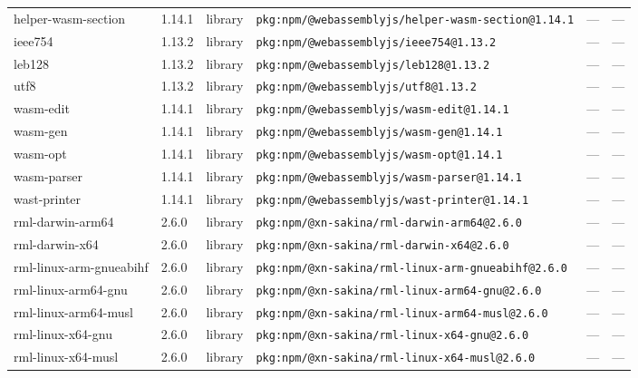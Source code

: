 \documentclass[11pt,a4paper]{article}
\begin{document}
\begin{longtable}{|p{4cm}|p{2cm}|p{1.6cm}|p{5cm}|p{1.5cm}|p{3.5cm}|}
\raggedright helper-wasm-section & 1.14.1 & library & \small\texttt{pkg:npm/@webassemblyjs/helper-wasm-section@1.14.1} & — & \small — \\
\raggedright ieee754 & 1.13.2 & library & \small\texttt{pkg:npm/@webassemblyjs/ieee754@1.13.2} & — & \small — \\
\raggedright leb128 & 1.13.2 & library & \small\texttt{pkg:npm/@webassemblyjs/leb128@1.13.2} & — & \small — \\
\raggedright utf8 & 1.13.2 & library & \small\texttt{pkg:npm/@webassemblyjs/utf8@1.13.2} & — & \small — \\
\raggedright wasm-edit & 1.14.1 & library & \small\texttt{pkg:npm/@webassemblyjs/wasm-edit@1.14.1} & — & \small — \\
\raggedright wasm-gen & 1.14.1 & library & \small\texttt{pkg:npm/@webassemblyjs/wasm-gen@1.14.1} & — & \small — \\
\raggedright wasm-opt & 1.14.1 & library & \small\texttt{pkg:npm/@webassemblyjs/wasm-opt@1.14.1} & — & \small — \\
\raggedright wasm-parser & 1.14.1 & library & \small\texttt{pkg:npm/@webassemblyjs/wasm-parser@1.14.1} & — & \small — \\
\raggedright wast-printer & 1.14.1 & library & \small\texttt{pkg:npm/@webassemblyjs/wast-printer@1.14.1} & — & \small — \\
\raggedright rml-darwin-arm64 & 2.6.0 & library & \small\texttt{pkg:npm/@xn-sakina/rml-darwin-arm64@2.6.0} & — & \small — \\
\raggedright rml-darwin-x64 & 2.6.0 & library & \small\texttt{pkg:npm/@xn-sakina/rml-darwin-x64@2.6.0} & — & \small — \\
\raggedright rml-linux-arm-gnueabihf & 2.6.0 & library & \small\texttt{pkg:npm/@xn-sakina/rml-linux-arm-gnueabihf@2.6.0} & — & \small — \\
\raggedright rml-linux-arm64-gnu & 2.6.0 & library & \small\texttt{pkg:npm/@xn-sakina/rml-linux-arm64-gnu@2.6.0} & — & \small — \\
\raggedright rml-linux-arm64-musl & 2.6.0 & library & \small\texttt{pkg:npm/@xn-sakina/rml-linux-arm64-musl@2.6.0} & — & \small — \\
\raggedright rml-linux-x64-gnu & 2.6.0 & library & \small\texttt{pkg:npm/@xn-sakina/rml-linux-x64-gnu@2.6.0} & — & \small — \\
\raggedright rml-linux-x64-musl & 2.6.0 & library & \small\texttt{pkg:npm/@xn-sakina/rml-linux-x64-musl@2.6.0} & — & \small — \\

\end{longtable}
\end{document}
